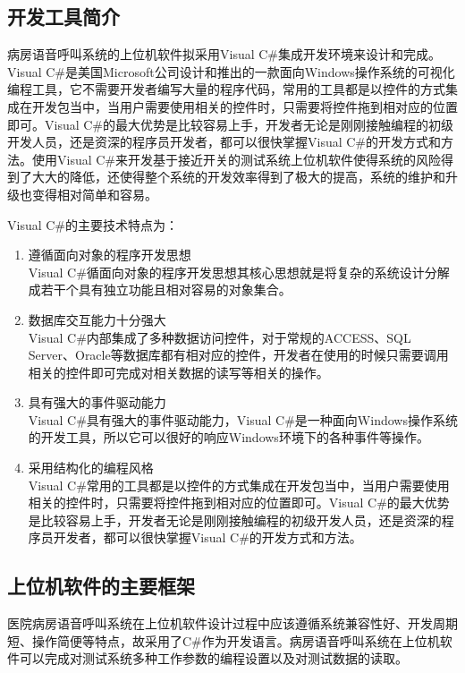 \subsection{开发工具简介}
病房语音呼叫系统的上位机软件拟采用Visual C{\#}集成开发环境来设计和完成。Visual C{\#}是美国Microsoft公司设计和推出的一款面向Windows操作系统的可视化编程工具，它不需要开发者编写大量的程序代码，常用的工具都是以控件的方式集成在开发包当中，当用户需要使用相关的控件时，只需要将控件拖到相对应的位置即可。Visual C{\#}的最大优势是比较容易上手，开发者无论是刚刚接触编程的初级开发人员，还是资深的程序员开发者，都可以很快掌握Visual C{\#}的开发方式和方法。使用Visual C{\#}来开发基于接近开关的测试系统上位机软件使得系统的风险得到了大大的降低，还使得整个系统的开发效率得到了极大的提高，系统的维护和升级也变得相对简单和容易。

Visual C{\#}的主要技术特点为：
\begin{enumerate}
\item 遵循面向对象的程序开发思想\\
Visual C{\#}循面向对象的程序开发思想其核心思想就是将复杂的系统设计分解成若干个具有独立功能且相对容易的对象集合。

\item 数据库交互能力十分强大\\
Visual C{\#}内部集成了多种数据访问控件，对于常规的ACCESS、SQL Server、Oracle等数据库都有相对应的控件，开发者在使用的时候只需要调用相关的控件即可完成对相关数据的读写等相关的操作。

\item 具有强大的事件驱动能力\\
Visual C{\#}具有强大的事件驱动能力，Visual C{\#}是一种面向Windows操作系统的开发工具，所以它可以很好的响应Windows环境下的各种事件等操作。

\item 采用结构化的编程风格\\
Visual C{\#}常用的工具都是以控件的方式集成在开发包当中，当用户需要使用相关的控件时，只需要将控件拖到相对应的位置即可。Visual C{\#}的最大优势是比较容易上手，开发者无论是刚刚接触编程的初级开发人员，还是资深的程序员开发者，都可以很快掌握Visual C{\#}的开发方式和方法。
\end{enumerate}

\subsection{上位机软件的主要框架}
医院病房语音呼叫系统在上位机软件设计过程中应该遵循系统兼容性好、开发周期短、操作简便等特点，故采用了C{\#}作为开发语言。病房语音呼叫系统在上位机软件可以完成对测试系统多种工作参数的编程设置以及对测试数据的读取。

